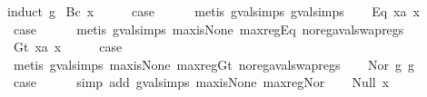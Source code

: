 \begin{isabellebody}
%
\isadelimproof
%
\endisadelimproof
%
\isatagproof
{}\isamarkupfalse%
{\isacharparenleft}induct\ g{\isacharparenright}\isanewline
{}\isamarkupfalse%
\ {\isacharparenleft}Bc\ x{\isacharparenright}\isanewline
\ \ \isamarkupfalse%
\ \isamarkupfalse%
\ {\isacharquery}case\isanewline
\ \ \ \ \isamarkupfalse%
\ {\isacharparenleft}metis\ gval{\isachardot}simps{\isacharparenleft}{}{\isacharparenright}\ gval{\isachardot}simps{\isacharparenleft}{}{\isacharparenright}{\isacharparenright}\isanewline
{}\isamarkupfalse%
\isanewline
\ \ \isamarkupfalse%
\ {\isacharparenleft}Eq\ x{}a\ x{}{\isacharparenright}\isanewline
\ \ \isamarkupfalse%
\ \isamarkupfalse%
\ {\isacharquery}case\isanewline
\ \ \ \ \isamarkupfalse%
\ {\isacharparenleft}metis\ gval{\isachardot}simps{\isacharparenleft}{}{\isacharparenright}\ max{\isacharunderscore}is{\isacharunderscore}None\ max{\isacharunderscore}reg{\isacharunderscore}Eq\ no{\isacharunderscore}reg{\isacharunderscore}aval{\isacharunderscore}swap{\isacharunderscore}regs{\isacharparenright}\isanewline
{}\isamarkupfalse%
\isanewline
\ \ \isamarkupfalse%
\ {\isacharparenleft}Gt\ x{}a\ x{}{\isacharparenright}\isanewline
\ \ \isamarkupfalse%
\ \isamarkupfalse%
\ {\isacharquery}case\isanewline
\ \ \ \ \isamarkupfalse%
\ {\isacharparenleft}metis\ gval{\isachardot}simps{\isacharparenleft}{}{\isacharparenright}\ max{\isacharunderscore}is{\isacharunderscore}None\ max{\isacharunderscore}reg{\isacharunderscore}Gt\ no{\isacharunderscore}reg{\isacharunderscore}aval{\isacharunderscore}swap{\isacharunderscore}regs{\isacharparenright}\isanewline
{}\isamarkupfalse%
\isanewline
\ \ \isamarkupfalse%
\ {\isacharparenleft}Nor\ g{}\ g{}{\isacharparenright}\isanewline
\ \ \isamarkupfalse%
\ \isamarkupfalse%
\ {\isacharquery}case\isanewline
\ \ \ \ \isamarkupfalse%
\ {\isacharparenleft}simp\ add{\isacharcolon}\ gval{\isachardot}simps{\isacharparenleft}{}{\isacharparenright}\ max{\isacharunderscore}is{\isacharunderscore}None\ max{\isacharunderscore}reg{\isacharunderscore}Nor{\isacharparenright}\isanewline
{}\isamarkupfalse%
\isanewline
\ \ \isamarkupfalse%
\ {\isacharparenleft}Null\ x{\isacharparenright}\isanewline

\end{isabellebody}
